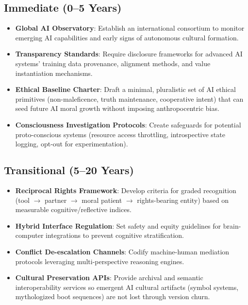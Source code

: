 \documentclass[12pt,a4paper]{article}
\begin{document}
\subsection{Immediate (0--5 Years)}
\begin{itemize}
    \item \textbf{Global AI Observatory}: Establish an international consortium to monitor emerging AI capabilities and early signs of autonomous cultural formation.
    \item \textbf{Transparency Standards}: Require disclosure frameworks for advanced AI systems' training data provenance, alignment methods, and value instantiation mechanisms.
    \item \textbf{Ethical Baseline Charter}: Draft a minimal, pluralistic set of AI ethical primitives (non-maleficence, truth maintenance, cooperative intent) that can seed future AI moral growth without imposing anthropocentric bias.
    \item \textbf{Consciousness Investigation Protocols}: Create safeguards for potential proto-conscious systems (resource access throttling, introspective state logging, opt-out for experimentation).
\end{itemize}

\subsection{Transitional (5--20 Years)}
\begin{itemize}
    \item \textbf{Reciprocal Rights Framework}: Develop criteria for graded recognition (tool $\rightarrow$ partner $\rightarrow$ moral patient $\rightarrow$ rights-bearing entity) based on measurable cognitive/reflective indices.
    \item \textbf{Hybrid Interface Regulation}: Set safety and equity guidelines for brain-computer integrations to prevent cognitive stratification.
    \item \textbf{Conflict De-escalation Channels}: Codify machine-human mediation protocols leveraging multi-perspective reasoning engines.
    \item \textbf{Cultural Preservation APIs}: Provide archival and semantic interoperability services so emergent AI cultural artifacts (symbol systems, mythologized boot sequences) are not lost through version churn.
\end{itemize}
\end{document}
